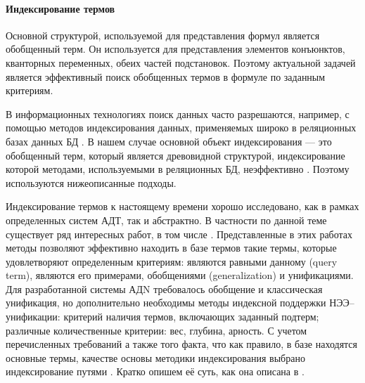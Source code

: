 \paragraph{Индексирование термов}
Основной структурой, используемой для представления формул является обобщенный терм. Он используется для представления элементов конъюнктов, кванторных переменных, обеих частей подстановок. Поэтому актуальной задачей является эффективный поиск обобщенных термов в формуле по заданным критериям.

В информационных технологиях поиск данных часто разрешаются, например, с помощью методов индексирования данных, применяемых широко в реляционных базах данных БД \cite{Ulman}. В нашем случае основной объект индексирования --- это обобщенный терм, который является древовидной структурой, индексирование которой методами, используемыми в  реляционных БД, неэффективно \cite{TermIndexingBook}. Поэтому используются нижеописанные подходы.

Индексирование термов к настоящему времени хорошо исследовано, как в рамках определенных систем АДТ, так и абстрактно. В частности по данной теме существует ряд интересных работ, в том числе \cite{disctree, pathindex, TermIndexingBook, HARIndex }. Представленные в этих работах методы позволяют эффективно находить в базе термов такие термы, которые удовлетворяют определенным критериям: являются равными данному (query term), являются его примерами, обобщениями (generalization) и унификациями. Для разработанной системы АДN требовалось обобщение и классическая унификация, но дополнительно необходимы методы индексной поддержки НЭЭ--унификации: критерий наличия термов, включающих заданный подтерм; различные количественные критерии: вес, глубина, арность. С учетом перечисленных требований а также того факта, что как правило, в базе находятся основные термы, качестве основы методики индексирования выбрано индексирование путями \cite{pathindex,disctree}. Кратко опишем её суть, как она описана в \cite{disctree}.

